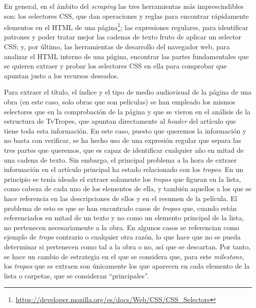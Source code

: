 En general, en el ámbito del \textit{scraping} las tres herramientas más
imprescindibles son: los selectores CSS, que dan operaciones y reglas para
encontrar rápidamente elementos en el HTML de una
página\footnote{\url{https://developer.mozilla.org/es/docs/Web/CSS/CSS_Selectors}};
las expresiones regulares, para identificar patrones y poder tratar mejor las
cadenas de texto fruto de aplicar un selector CSS; y, por último, las
herramientas de desarrollo del navegador web, para analizar el HTML interno de
una página, encontrar las partes fundamentales que se quieren extraer y probar los
selectores CSS en ella para comprobar que apuntan justo a los recursos deseados.

Para extraer el título, el índice y el tipo de medio audiovisual de la página de
una obra (en este caso, solo obras que son películas) se han empleado los mismos
selectores que en la comprobación de la página y que se vieron en el análisis de
la estructura de TvTropes, que apuntan directamente al \textit{header} del
artículo que tiene toda esta información. En este caso, puesto que queremos la
información y no basta con verificar, se ha hecho uso de una expresión regular
que separa las tres partes que queremos, que es capaz de identificar cualquier
año en mitad de una cadena de texto. Sin embargo, el principal problema a la
hora de extraer información en el artículo principal ha estado relacionado con
los \textit{tropos}. En un principio se tenía ideado el extraer solamente los
\textit{tropos} que figuran en la lista, como cabeza de cada uno de los
elementos de ella, y también aquellos a los que se hace referencia en las
descripciones de ellos y en el resumen de la película. El problema de esto es
que se han encontrado casos de \textit{tropos} que, cuando están referenciados
en mitad de un texto y no como un elemento principal de la lista, no pertenecen
necesariamente a la obra. En algunos casos se referencian como ejemplo de
\textit{tropo} contrario o cualquier otra razón, lo que hace que no se pueda
determinar si pertenecen como tal a la obra o no, así que se descartan. Por
tanto, se hace un cambio de estrategia en el que se considera que, para este
\textit{milestone}, los \textit{tropos} que se extraen son únicamente los que
aparecen en cada elemento de la lista o carpetas, que se consideran
``principales''.

